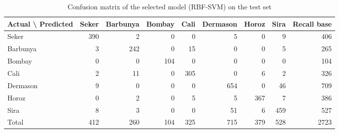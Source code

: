 \begin{table}[htbp]
\centering
\scriptsize
\caption{Confusion matrix of the selected model (RBF-SVM) on the test set}
\label{tab:confusion_best}
\begin{tabular}{lrrrrrrrr}
\toprule
Actual \textbackslash{} Predicted & Seker & Barbunya & Bombay & Cali & Dermason & Horoz & Sira & Recall base \\
\midrule
Seker & 390 & 2 & 0 & 0 & 5 & 0 & 9 & 406 \\
Barbunya & 3 & 242 & 0 & 15 & 0 & 0 & 5 & 265 \\
Bombay & 0 & 0 & 104 & 0 & 0 & 0 & 0 & 104 \\
Cali & 2 & 11 & 0 & 305 & 0 & 6 & 2 & 326 \\
Dermason & 9 & 0 & 0 & 0 & 654 & 0 & 46 & 709 \\
Horoz & 0 & 2 & 0 & 5 & 5 & 367 & 7 & 386 \\
Sira & 8 & 3 & 0 & 0 & 51 & 6 & 459 & 527 \\
\midrule
Total & 412 & 260 & 104 & 325 & 715 & 379 & 528 & 2723 \\
\bottomrule
\end{tabular}
\end{table}
